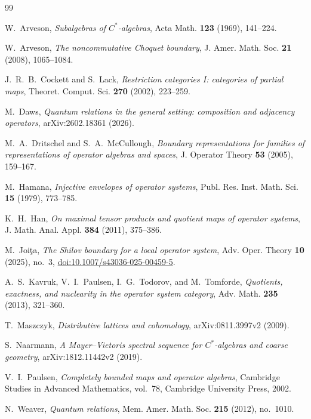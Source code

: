 \documentclass[11pt,a4paper]{amsart}
\theoremstyle{plain}
\theoremstyle{definition}
\begin{document}
\sloppy
\begin{thebibliography}{99}

W.~Arveson,
\emph{Subalgebras of $C^*$-algebras},
Acta Math. \textbf{123} (1969), 141--224.

W.~Arveson,
\emph{The noncommutative Choquet boundary},
J. Amer. Math. Soc. \textbf{21} (2008), 1065--1084.

J.~R.~B.~Cockett and S.~Lack,
\emph{Restriction categories I: categories of partial maps},
Theoret. Comput. Sci. \textbf{270} (2002), 223--259.

M.~Daws,
\emph{Quantum relations in the general setting: composition and adjacency operators},
arXiv:2602.18361 (2026).

M.~A.~Dritschel and S.~A.~McCullough,
\emph{Boundary representations for families of representations of operator algebras and spaces},
J. Operator Theory \textbf{53} (2005), 159--167.

M.~Hamana,
\emph{Injective envelopes of operator systems},
Publ. Res. Inst. Math. Sci. \textbf{15} (1979), 773--785.

K.~H.~Han,
\emph{On maximal tensor products and quotient maps of operator systems},
J. Math. Anal. Appl. \textbf{384} (2011), 375--386.

M.~Joi\c{t}a,
\emph{The Shilov boundary for a local operator system},
Adv. Oper. Theory \textbf{10} (2025), no.~3,
\href{https://doi.org/10.1007/s43036-025-00459-5}{doi:10.1007/s43036-025-00459-5}.

A.~S.~Kavruk, V.~I.~Paulsen, I.~G.~Todorov, and M.~Tomforde,
\emph{Quotients, exactness, and nuclearity in the operator system category},
Adv. Math. \textbf{235} (2013), 321--360.

T.~Maszczyk,
\emph{Distributive lattices and cohomology},
arXiv:0811.3997v2 (2009).

S.~Naarmann,
\emph{A Mayer--Vietoris spectral sequence for $C^*$-algebras and coarse geometry},
arXiv:1812.11442v2 (2019).

V.~I.~Paulsen,
\emph{Completely bounded maps and operator algebras},
Cambridge Studies in Advanced Mathematics, vol.~78, Cambridge University Press, 2002.

N.~Weaver,
\emph{Quantum relations},
Mem. Amer. Math. Soc. \textbf{215} (2012), no.~1010.

\end{thebibliography}
\end{document}
